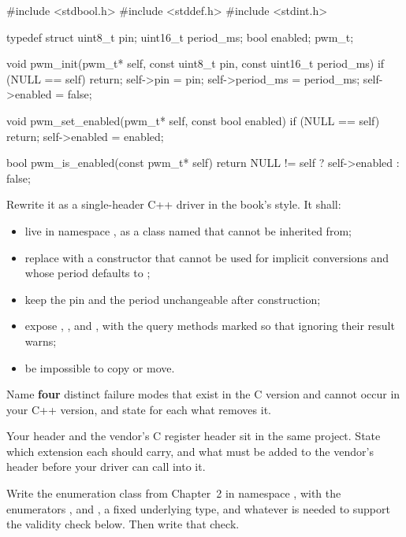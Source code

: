 \begin{ccode}
#include <stdbool.h>
#include <stddef.h>
#include <stdint.h>

typedef struct
{
    uint8_t pin;
    uint16_t period_ms;
    bool enabled;
} pwm_t;

void pwm_init(pwm_t* self, const uint8_t pin, const uint16_t period_ms)
{
    if (NULL == self) { return; }
    self->pin       = pin;
    self->period_ms = period_ms;
    self->enabled   = false;
}

void pwm_set_enabled(pwm_t* self, const bool enabled)
{
    if (NULL == self) { return; }
    self->enabled = enabled;
}

bool pwm_is_enabled(const pwm_t* self)
{
    return NULL != self ? self->enabled : false;
}
\end{ccode}

 Rewrite it as a single-header C++ driver in the book's style. It shall:
\begin{itemize}
  \item live in namespace , as a class named  that cannot be inherited
    from;
  \item replace  with a constructor that cannot be used for implicit conversions and
    whose period defaults to ;
  \item keep the pin and the period unchangeable after construction;
  \item expose , ,  and , with the
    query methods marked so that ignoring their result warns;
  \item be impossible to copy or move.
\end{itemize}
\noindent{}

 Name \textbf{four} distinct failure modes that exist in the C version and cannot occur in
your C++ version, and state for each what removes it. 

 Your header and the vendor's C register header sit in the same project. State which
extension each should carry, and what must be added to the vendor's header before your driver can
call into it. 

\label{exb:q:3}

 Write the enumeration class  from Chapter~2 in namespace
, with the enumerators ,  and , a fixed
underlying type, and whatever is needed to support the validity check below. Then write that check.

